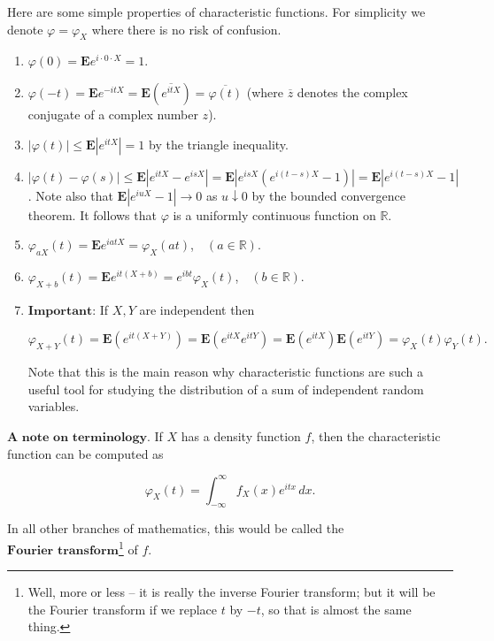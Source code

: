 \documentclass[11pt]{report}
\newcommand{\R}{\mathbb{R}}
\theoremstyle{plain}
\theoremstyle{definition}
\begin{document}
Here are some simple properties of characteristic
functions. For simplicity we denote
$\varphi = \varphi_X$ where there is no risk of
confusion.

\begin{enumerate}[label=\arabic*.]
\item $\varphi(0) = \mathbf{E} e^{i\cdot 0\cdot X} = 1$.

\item $\varphi(-t) = \mathbf{E} e^{-i t X} = \mathbf{E}
\left(\overline{e^{it X}}\right) =
\overline{\varphi(t)}$
(where $\overline{z}$ denotes the complex conjugate
of a complex number $z$).

\item $|\varphi(t)| \le \mathbf{E}\left|e^{i t X}\right| =
1$
by the triangle inequality.

\item $|\varphi(t)-\varphi(s)| \le \mathbf{E} \left| e^{i t
X} - e^{isX}\right| = \mathbf{E} \left|e^{i s X}
\left(e^{i(t-s)X}-1\right)\right| = \mathbf{E} \left|
e^{i(t-s)X}-1\right|$.
Note also that
$\mathbf{E} \left|e^{i u X}-1\right|\to 0$ as
$u \downarrow 0$ by the bounded convergence theorem.
It follows that $\varphi$ is a uniformly continuous
function on $\R$.

\item $\varphi_{a X}(t) = \mathbf{E} e^{i a t X} =
\varphi_X(a t)$,\
\ $(a\in\R)$.

\item $\varphi_{X+b}(t) = \mathbf{E} e^{i t (X+b)} = e^{i b
t} \varphi_X(t)$,\
\ $(b\in\R)$.

\item $\textbf{Important:}$ If $X,Y$ are independent then

\[
\varphi_{X+Y}(t) = \mathbf{E}\left(e^{it(X+Y)}\right)
= \mathbf{E}\left(e^{itX} e^{itY}\right) = \mathbf{E}\left(e^{itX}\right) \mathbf{E} \left(e^{itY}\right) = \varphi_X(t) \varphi_Y(t).
\]

Note that this is the main reason why characteristic
functions are such a useful tool for studying the
distribution of a sum of independent random variables.
\end{enumerate}

$\textbf{A note on terminology.}$ If $X$ has a
density function $f$, then the characteristic
function can be computed as

\[
\varphi_X(t) = \int_{-\infty}^\infty f_X(x) e^{itx}\,dx.
\]

In all other branches of mathematics, this would be
called the
$\textbf{Fourier transform}$\footnote{Well, more or less -- it is really the inverse
Fourier transform; but it will be the Fourier
transform if we replace $t$ by $-t$, so that is
almost the same thing.}
of $f$.
\end{document}
